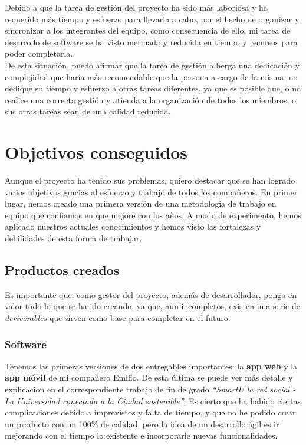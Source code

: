 Debido a que la tarea de gestión del proyecto ha sido más laboriosa y ha requerido más tiempo y esfuerzo para llevarla a cabo, por el hecho de organizar y sincronizar a los integrantes del equipo, como consecuencia de ello, mi tarea de desarrollo de software se ha visto mermada y reducida en tiempo y recursos para poder completarla.\\

De esta situación, puedo afirmar que la tarea de gestión alberga una dedicación y complejidad que haría más recomendable que la persona a cargo de la misma, no dedique su tiempo y esfuerzo a otras tareas diferentes, ya que es posible que, o no realice una correcta gestión y atienda a la organización de todos los miembros, o sus otras tareas sean de una calidad reducida.

\section{Objetivos conseguidos}
Aunque el proyecto ha tenido sus problemas, quiero destacar que se han logrado varios objetivos gracias al esfuerzo y trabajo de todos los compañeros. En primer lugar, hemos creado una primera versión de una metodología de trabajo en equipo que confiamos en que mejore con los años. A modo de experimento, hemos aplicado nuestros actuales conocimientos y hemos visto las fortalezas y debilidades de esta forma de trabajar.

\subsection{Productos creados}
Es importante que, como gestor del proyecto, además de desarrollador, ponga en valor todo lo que se ha ido creando, ya que, aun incompletos, existen una serie de \textit{deriverables} que sirven como base para completar en el futuro.\\

\subsubsection{Software}
Tenemos las primeras versiones de dos entregables importantes: la \textbf{app web} y la \textbf{app móvil} de mi compañero Emilio. De esta última se puede ver más detalle y explicación en el correspondiente trabajo de fin de grado \textit{``SmartU la red social - La Universidad conectada a la Ciudad sostenible''}. Es cierto que ha habido ciertas complicaciones debido a imprevistos y falta de tiempo, y que no he podido crear un producto con un 100\% de calidad, pero la idea de un desarrollo ágil es ir mejorando con el tiempo lo existente e incorporarle nuevas funcionalidades.

